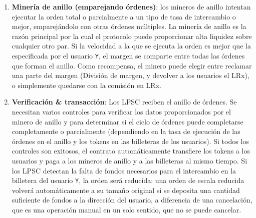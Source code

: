 \documentclass[UTF8,nofonts]{article}
\makeatletter
\newenvironment{figurehere}
 {\def\@captype{figure}}
 {}
\makeatother
\begin{document}
\begin{multicols}{2}
\begin{enumerate}
\begin{center}
\begin{figurehere}

\caption{Proceso de Intercambio de Loopring}
\label{fig:process}
\end{figurehere}
\end{center}

\item \textbf{Miner\'ia de anillo (emparejando \'ordenes)}:  los mineros de anillo intentan ejecutar la orden total o parcialmente a un tipo de tasa de intercambio o mejor, emparej\'andolo con otras \'ordenes m\'ultiples. La miner\'ia de anillo es la raz\'on principal por la cual el protocolo puede proporcionar alta liquidez sobre cualquier otro par. Si la velocidad a la que se ejecuta la orden es mejor que la especificada por el usuario \verb|Y|, el margen se comparte entre todas las \'ordenes que forman el anillo. Como recompensa, el minero puede elegir entre reclamar una parte del margen (Divisi\'on de margen, y devolver a los usuarios el LRx), o simplemente quedarse con la comisi\'on en LRx.


\item \textbf{Verificaci\'on \& transacci\'on}: Los LPSC reciben el anillo de \'ordenes. Se necesitan varios controles para verificar los datos proporcionados por el minero de anillo y para determinar si el ciclo de \'ordenes puede completarse completamente o parcialmente (dependiendo en la tasa de ejecuci\'on de las \'ordenes en el anillo y los tokens en las billeteras de los usuarios). Si todos los controles son exitosos, el contrato autom\'aticamente transfiere los tokens a los usuarios y paga a los mineros de anillo y a las billeteras al mismo tiempo. Si los LPSC detectan la falta de fondos necesarios para el intercambio en la billetera del usuario \verb|Y|, la orden ser\'a reducida: una orden de escala reducida volver\'a autom\'aticamente a su tama\~no original si se deposita una cantidad suficiente de fondos a la direcci\'on del usuario, a diferencia de una cancelaci\'on, que es una operaci\'on manual en un solo sentido, que no se puede cancelar.


\end{enumerate}





%
%
%



\end{multicols}
\end{document}
